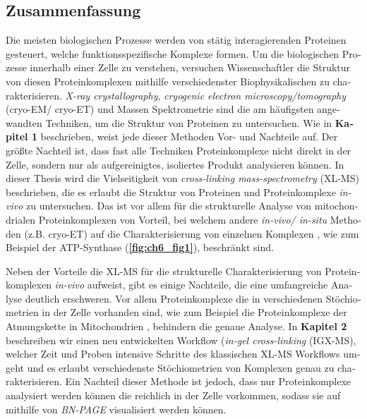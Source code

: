 \begin{otherlanguage}{german}
    \section{Zusammenfassung}
    Die meisten biologischen Prozesse werden von stätig interagierenden Proteinen gesteuert, welche funktionsspezifische Komplexe formen. Um die biologischen Prozesse innerhalb einer Zelle zu verstehen, versuchen Wissenschaftler die Struktur von diesen Proteinkomplexen mithilfe verschiedenster Biophysikalischen zu charakterisieren. \emph{X-ray crystallography}, \emph{cryogenic electron microscopy/tomography} (cryo-EM/ cryo-ET) und Massen Spektrometrie sind die am häufigsten angewandten Techniken, um die Struktur von Proteinen zu untersuchen. Wie in \textbf{Kapitel 1} beschrieben, weist jede dieser Methoden Vor- und Nachteile auf. Der größte Nachteil ist, dass fast alle Techniken Proteinkomplexe nicht direkt in der Zelle, sondern nur als aufgereinigtes, isoliertes Produkt analysieren können. In dieser Thesis wird die Vielseitigkeit von \emph{cross-linking mass-spectrometry} (XL-MS) beschrieben, die es erlaubt die Struktur von Proteinen und Proteinkomplexe \emph{in-vivo} zu untersuchen. Das ist vor allem für die strukturelle Analyse von mitochondrialen Proteinkomplexen von Vorteil, bei welchem andere \emph{in-vivo/ in-situ} Methoden (z.B. cryo-ET) auf die Charakterisierung von einzelnen Komplexen \cite{RN1}, wie zum Beispiel der ATP-Synthase (\textbf{\autoref{fig:ch6_fig1}}), beschränkt sind.

    Neben der Vorteile die XL-MS für die strukturelle Charakterisierung von Proteinkomplexen \emph{in-vivo} aufweist, gibt es einige Nachteile, die eine umfangreiche Analyse deutlich erschweren. Vor allem Proteinkomplexe die in verschiedenen Stöchiometrien in der Zelle vorhanden sind, wie zum Beispiel die Proteinkomplexe der Atmungskette in Mitochondrien \cite{RN3}, behindern die genaue Analyse. In \textbf{Kapitel 2} beschreiben wir einen neu entwickelten Workflow (\emph{in-gel cross-linking} (IGX-MS), welcher Zeit und Proben intensive Schritte des klassischen XL-MS Workflows umgeht und es erlaubt verschiedenste Stöchiometrien von Komplexen genau zu charakterisieren. Ein Nachteil dieser Methode ist jedoch, dass nur Proteinkomplexe analysiert werden können die reichlich in der Zelle vorkommen, sodass sie auf mithilfe von \emph{BN-PAGE} visualisiert werden können.


\end{otherlanguage}

